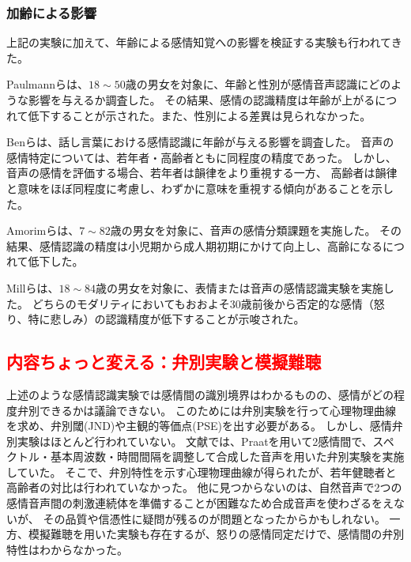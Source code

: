 \subsubsection{加齢による影響}
上記の実験に加えて、年齢による感情知覚への影響を検証する実験も行われてきた。

Paulmannらは、$18 \sim 50$歳の男女を対象に、年齢と性別が感情音声認識にどのような影響を与えるか調査した\cite{paulmann2008aging}。
その結果、感情の認識精度は年齢が上がるにつれて低下することが示された。また、性別による差異は見られなかった。

Benらは、話し言葉における感情認識に年齢が与える影響を調査した\cite{ben2019age}。
音声の感情特定については、若年者・高齢者ともに同程度の精度であった。
しかし、音声の感情を評価する場合、若年者は韻律をより重視する一方、
高齢者は韻律と意味をほぼ同程度に考慮し、わずかに意味を重視する傾向があることを示した。

Amorimらは、$7 \sim 82$歳の男女を対象に、音声の感情分類課題を実施した\cite{amorim2021changes}。
その結果、感情認識の精度は小児期から成人期初期にかけて向上し、高齢になるにつれて低下した。

Millらは、$18 \sim 84$歳の男女を対象に、表情または音声の感情認識実験を実施した。
どちらのモダリティにおいてもおおよそ30歳前後から否定的な感情（怒り、特に悲しみ）の認識精度が低下することが示唆された。


\subsection{\textcolor{red}{内容ちょっと変える：弁別実験と模擬難聴}}
上述のような感情認識実験では感情間の識別境界はわかるものの、感情がどの程度弁別できるかは議論できない。
このためには弁別実験を行って心理物理曲線を求め、弁別閾(JND)や主観的等価点(PSE)を出す必要がある。
しかし、感情弁別実験はほとんど行われていない。
文献\cite{laukka2005categorical}では、Praat\cite{boersma2001speak}を用いて2感情間で、スペクトル・基本周波数・時間間隔を調整して合成した音声を用いた弁別実験を実施していた。
そこで、弁別特性を示す心理物理曲線が得られたが、若年健聴者と高齢者の対比は行われていなかった。
他に見つからないのは、自然音声で2つの感情音声間の刺激連続体を準備することが困難なため合成音声を使わざるをえないが、
その品質や信憑性に疑問が残るのが問題となったからかもしれない。
一方、模擬難聴を用いた実験も存在するが、怒りの感情同定\cite{morgan2022perceived}だけで、感情間の弁別特性はわからなかった。

